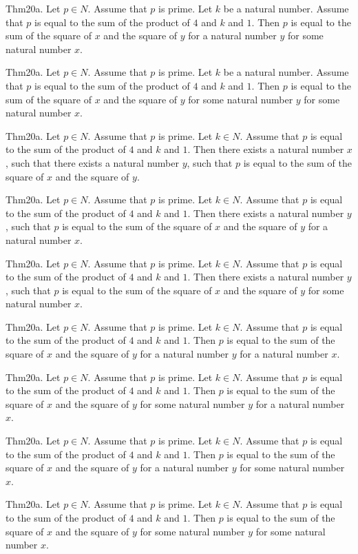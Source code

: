 \documentclass{article}
\begin{document}
Thm20a. Let $p \in N$. Assume that $p$ is prime. Let $k$ be a natural number. Assume that $p$ is equal to the sum of the product of $4$ and $k$ and $1$. Then $p$ is equal to the sum of the square of $x$ and the square of $y$ for a natural number $y$ for some natural number $x$.

Thm20a. Let $p \in N$. Assume that $p$ is prime. Let $k$ be a natural number. Assume that $p$ is equal to the sum of the product of $4$ and $k$ and $1$. Then $p$ is equal to the sum of the square of $x$ and the square of $y$ for some natural number $y$ for some natural number $x$.

Thm20a. Let $p \in N$. Assume that $p$ is prime. Let $k \in N$. Assume that $p$ is equal to the sum of the product of $4$ and $k$ and $1$. Then there exists a natural number $x$, such that there exists a natural number $y$, such that $p$ is equal to the sum of the square of $x$ and the square of $y$.

Thm20a. Let $p \in N$. Assume that $p$ is prime. Let $k \in N$. Assume that $p$ is equal to the sum of the product of $4$ and $k$ and $1$. Then there exists a natural number $y$, such that $p$ is equal to the sum of the square of $x$ and the square of $y$ for a natural number $x$.

Thm20a. Let $p \in N$. Assume that $p$ is prime. Let $k \in N$. Assume that $p$ is equal to the sum of the product of $4$ and $k$ and $1$. Then there exists a natural number $y$, such that $p$ is equal to the sum of the square of $x$ and the square of $y$ for some natural number $x$.

Thm20a. Let $p \in N$. Assume that $p$ is prime. Let $k \in N$. Assume that $p$ is equal to the sum of the product of $4$ and $k$ and $1$. Then $p$ is equal to the sum of the square of $x$ and the square of $y$ for a natural number $y$ for a natural number $x$.

Thm20a. Let $p \in N$. Assume that $p$ is prime. Let $k \in N$. Assume that $p$ is equal to the sum of the product of $4$ and $k$ and $1$. Then $p$ is equal to the sum of the square of $x$ and the square of $y$ for some natural number $y$ for a natural number $x$.

Thm20a. Let $p \in N$. Assume that $p$ is prime. Let $k \in N$. Assume that $p$ is equal to the sum of the product of $4$ and $k$ and $1$. Then $p$ is equal to the sum of the square of $x$ and the square of $y$ for a natural number $y$ for some natural number $x$.

Thm20a. Let $p \in N$. Assume that $p$ is prime. Let $k \in N$. Assume that $p$ is equal to the sum of the product of $4$ and $k$ and $1$. Then $p$ is equal to the sum of the square of $x$ and the square of $y$ for some natural number $y$ for some natural number $x$.
\end{document}
